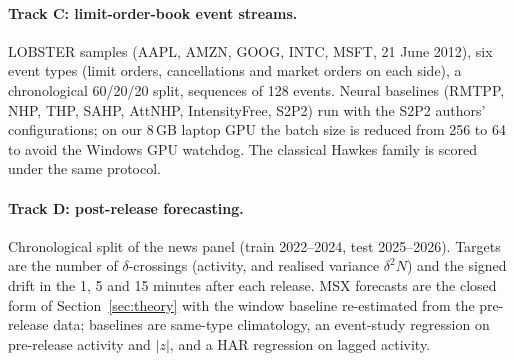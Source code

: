 \paragraph{Track C: limit-order-book event streams.}
LOBSTER samples (AAPL, AMZN, GOOG, INTC, MSFT, 21 June 2012), six event types (limit
orders, cancellations and market orders on each side), a chronological 60/20/20 split,
sequences of 128 events. Neural baselines (RMTPP, NHP, THP, SAHP, AttNHP,
IntensityFree, S2P2) run with the S2P2 authors' configurations; on our 8\,GB laptop GPU
the batch size is reduced from 256 to 64 to avoid the Windows GPU watchdog. The classical
Hawkes family is scored under the same protocol.

\paragraph{Track D: post-release forecasting.}
Chronological split of the news panel (train 2022--2024, test 2025--2026). Targets are
the number of $\delta$-crossings (activity, and realised variance $\delta^2N$) and the
signed drift in the 1, 5 and 15 minutes after each release. MSX forecasts are the closed
form of Section~\ref{sec:theory} with the window baseline re-estimated from the
pre-release data; baselines are same-type climatology, an event-study regression on
pre-release activity and $|z|$, and a HAR regression on lagged activity.
